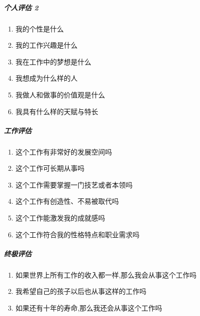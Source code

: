 \documentclass[letterpaper,10pt,english]{sphinxmanual}
\begin{document}
\subparagraph{个人评估 2\sphinxfootnotemark[832]}
\label{\detokenize{chapter_interview/choose:id3}}%
\begin{footnotetext}[832]\sphinxAtStartFootnote
{}
%
\end{footnotetext}\ignorespaces \begin{enumerate}
%
\item {} 
我的个性是什么

\item {} 
我的工作兴趣是什么

\item {} 
我在工作中的梦想是什么

\item {} 
我想成为什么样的人

\item {} 
我做人和做事的价值观是什么

\item {} 
我具有什么样的天赋与特长

\end{enumerate}


\subparagraph{工作评估}
\label{\detokenize{chapter_interview/choose:id4}}\begin{enumerate}
%
\item {} 
这个工作有非常好的发展空间吗

\item {} 
这个工作可长期从事吗

\item {} 
这个工作需要掌握一门技艺或者本领吗

\item {} 
这个工作有创造性、不易被取代吗

\item {} 
这个工作能激发我的成就感吗

\item {} 
这个工作符合我的性格特点和职业需求吗

\end{enumerate}


\subparagraph{终极评估}
\label{\detokenize{chapter_interview/choose:id5}}\begin{enumerate}
%
\item {} 
如果世界上所有工作的收入都一样,那么我会从事这个工作吗

\item {} 
我希望自己的孩子以后也从事这样的工作吗

\item {} 
如果还有十年的寿命,那么我还会从事这个工作吗

\end{enumerate}
\end{document}
